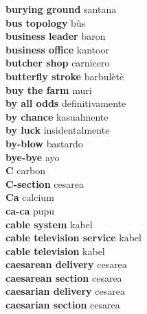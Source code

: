 \textbf{ burying ground  } santana \\
\textbf{ bus topology  } bùs \\
\textbf{ business leader  } baron \\
\textbf{ business office  } kantoor \\
\textbf{ butcher shop  } carnicero \\
\textbf{ butterfly stroke  } barbulètè \\
\textbf{ buy the farm  } muri \\
\textbf{ by all odds  } definitivamente \\
\textbf{ by chance  } kasualmente \\
\textbf{ by luck  } insidentalmente \\
\textbf{ by-blow  } bastardo \\
\textbf{ bye-bye  } ayo \\
\textbf{ C  } carbon \\
\textbf{ C-section  } cesarea \\
\textbf{ Ca  } calcium \\
\textbf{ ca-ca  } pupu \\
\textbf{ cable system  } kabel \\
\textbf{ cable television service  } kabel \\
\textbf{ cable television  } kabel \\
\textbf{ caesarean delivery  } cesarea \\
\textbf{ caesarean section  } cesarea \\
\textbf{ caesarian delivery  } cesarea \\
\textbf{ caesarian section  } cesarea \\
